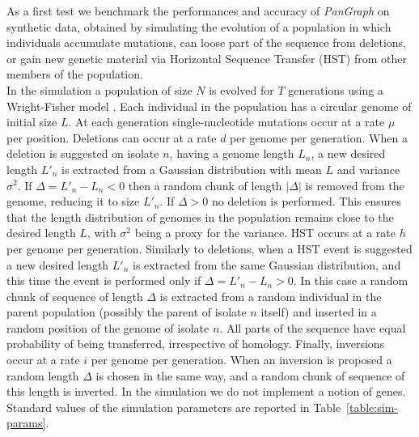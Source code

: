 \documentclass[aps,rmp,reprint,superscriptaddress,notitlepage,10pt,onecolumn]{revtex4-1}
\begin{document}
As a first test we benchmark the performances and accuracy of \textit{PanGraph} on synthetic data, obtained by simulating the evolution of a population in which individuals accumulate mutations, can loose part of the sequence from deletions, or gain new genetic material via Horizontal Sequence Transfer (HST) from other members of the population.\\
In the simulation a population of size $N$ is evolved for $T$ generations using a Wright-Fisher model \cite{hudson2002generating}. Each individual in the population has a circular genome of initial size $L$. At each generation single-nucleotide mutations occur at a rate $\mu$ per position. Deletions can occur at a rate $d$ per genome per generation. When a deletion is suggested on isolate $n$, having a genome length $L_n$, a new desired length $L'_n$ is extracted from a Gaussian distribution with mean $L$ and variance $\sigma^2$. If $\Delta = L'_n - L_n < 0$ then a random chunk of length $|\Delta|$ is removed from the genome, reducing it to size $L'_n$. If $\Delta > 0$ no deletion is performed. This ensures that the length distribution of genomes in the population remains close to the desired length $L$, with $\sigma^2$ being a proxy for the variance.
HST occurs at a rate $h$ per genome per generation. Similarly to deletions, when a HST event is suggested a new desired length $L'_n$ is extracted from the same Gaussian distribution, and this time the event is performed only if $\Delta = L'_n - L_n > 0$. In this case a random chunk of sequence of length $\Delta$ is extracted from a random individual in the parent population (possibly the parent of isolate $n$ itself) and inserted in a random position of the genome of isolate $n$. All parts of the sequence have equal probability of being transferred, irrespective of homology.
Finally, inversions occur at a rate $i$ per genome per generation. When an inversion is proposed a random length $\Delta$ is chosen in the same way, and a random chunk of sequence of this length is inverted. In the simulation we do not implement a notion of genes.
Standard values of the simulation parameters are reported in Table~\ref{table:sim-params}.
\end{document}
